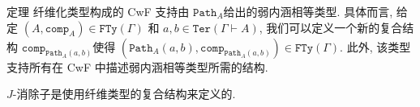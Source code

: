 \documentclass[aspectratio=169,xcolor=dvipsnames]{beamer}
\newcommand\FTy{\mathtt{FTy}}
\newcommand\comp{\mathtt{comp}}
\newcommand\Ter{\mathtt{Ter}}
\newcommand\Path{\mathtt{Path}}
\begin{document}
\begin{frame}{定理}
   纤维化类型构成的 CwF 支持由 $\Path_{A}$​ 给出的弱内涵相等类型. 具体而言, 给定 $(A,\comp_{A})\in\FTy(\Gamma)$ 和 $a,b\in\Ter(\Gamma\vdash A)$, 我们可以定义一个新的复合结构 $\comp_{\Path_{A}(a,b)}$​ 使得 $(\Path_{A}(a,b),\comp_{\Path_{A}(a,b)})\in\FTy(\Gamma)$. 此外, 该类型支持所有在 CwF 中描述弱内涵相等类型所需的结构.

   $J$-消除子是使用纤维类型的复合结构来定义的.
\end{frame}
\end{document}
